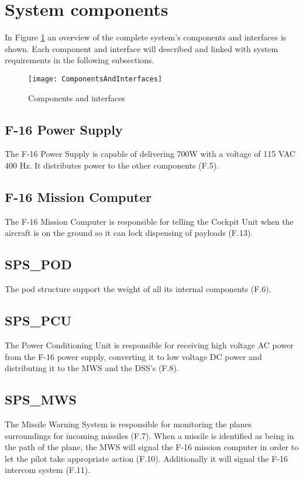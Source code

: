 \documentclass[Main]{subfiles}
\begin{document}
\section{System components}

In Figure \ref{fig:ComponentsAndInterfaces} an overview of the complete system's components and interfaces is shown.
Each component and interface will described and linked with system requirements in the following subsections.

\begin{figure}[H]
\centering
\texttt{[image: ComponentsAndInterfaces]}
\caption{Components and interfaces}
\label{fig:ComponentsAndInterfaces}
\end{figure}

\subsection{F-16 Power Supply}
The F-16 Power Supply is capable of delivering 700W with a voltage of 115 VAC 400 Hz. It distributes power to the other components (F.5).

\subsection{F-16 Mission Computer}
The F-16 Mission Computer is responsible for telling the Cockpit Unit when the aircraft is on the ground so it can lock dispensing of payloads (F.13).

\subsection{SPS\_POD}
The pod structure support the weight of all its internal components (F.6).

\subsection{SPS\_PCU}
The Power Conditioning Unit is responsible for receiving high voltage AC power from the F-16 power supply, converting it to low voltage DC power and distributing it to the MWS and the DSS's (F.8).

\subsection{SPS\_MWS}
The Missile Warning System is responsible for monitoring the planes surroundings for incoming missiles (F.7).
When a missile is identified as being in the path of the plane, the MWS will signal the F-16 mission computer in order to let the pilot take appropriate action (F.10).
Additionally it will signal the F-16 intercom system (F.11).
\end{document}
